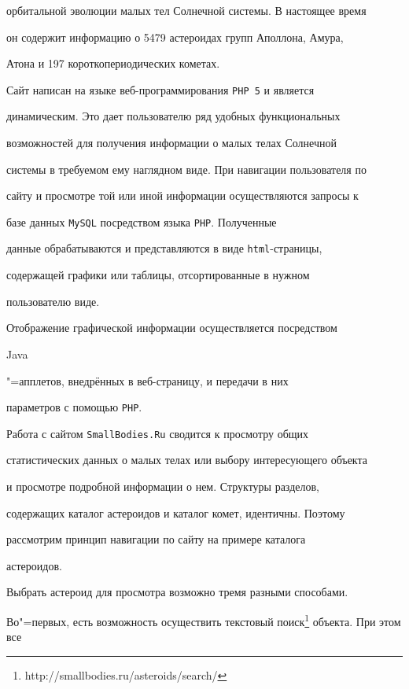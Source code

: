 орбитальной эволюции малых тел Солнечной системы. В настоящее время


он содержит информацию о 5479 астероидах групп Аполлона, Амура,


Атона и 197 короткопериодических кометах.





Сайт написан на языке веб-программирования {\tt PHP 5} и является


динамическим. Это дает пользователю ряд удобных функциональных


возможностей для получения информации о малых телах Солнечной


системы в требуемом ему наглядном виде. При навигации пользователя по


сайту и просмотре той или иной информации осуществляются запросы к


базе данных {\tt MySQL} посредством языка {\tt PHP}. Полученные


данные обрабатываются и представляются в виде {\tt html}-страницы,


содержащей графики или таблицы, отсортированные в нужном


пользователю виде.





Отображение графической информации осуществляется посредством {\tt


Java}"=апплетов, внедрённых в веб-страницу, и передачи в них


параметров с помощью {\tt PHP}.





Работа с сайтом {\tt SmallBodies.Ru} сводится к просмотру общих


статистических данных о малых телах или выбору интересующего объекта


и просмотре подробной информации о нем. Структуры разделов,


содержащих каталог астероидов и каталог комет, идентичны. Поэтому


рассмотрим принцип навигации по сайту на примере каталога


астероидов.





Выбрать астероид для просмотра возможно тремя разными способами.


Во"=первых, есть возможность осуществить текстовый поиск\footnote{\tt


http://smallbodies.ru/asteroids/search/}\!\! объекта. При этом все


